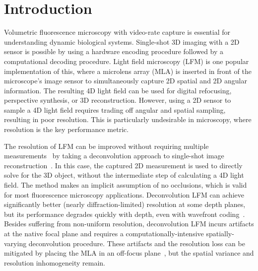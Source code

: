 \documentclass{osa-article}
\begin{document}
\section{Introduction}




Volumetric fluorescence microscopy with video-rate capture is essential for understanding dynamic biological systems. Single-shot 3D imaging with a 2D sensor is possible by using a hardware encoding procedure followed by a computational decoding procedure. Light field microscopy (LFM) \cite{lippmann1908LF,okano1997LF,Javidi2004lfm,javidi2006lfm,levoy2006lfm,martinez2018LFMreview} is one popular implementation of this, where a microlens array (MLA) is inserted in front of the microscope's image sensor to simultaneously capture 2D spatial and 2D angular information. The resulting 4D light field can be used for digital refocusing, perspective synthesis, or 3D reconstruction. However, using a 2D sensor to sample a 4D light field requires trading off angular and spatial sampling, resulting in poor resolution. This is particularly undesirable in microscopy, where resolution is the key performance metric.

The resolution of LFM can be improved without requiring multiple measurements~\cite{javidi2003LFsequence} by taking a deconvolution approach to single-shot image
reconstruction~\cite{broxton2013lfm,prevedel2014lfm_worm}. In this case, the captured 2D measurement is used to directly solve for the 3D object, without the intermediate step of calculating a 4D light field. The method makes an implicit assumption of no occlusions, which is valid for most fluorescence microscopy applications. Deconvolution LFM can achieve significantly better (nearly diffraction-limited) resolution at some depth planes, but its performance degrades quickly with depth, even with wavefront coding~\cite{cohen2014enhancing}. Besides suffering from non-uniform resolution, deconvolution LFM incurs artifacts at the native focal plane and requires a computationally-intensive spatially-varying deconvolution procedure. These artifacts and the resolution loss can be mitigated by placing the MLA in an off-focus plane~\cite{lumsdaine2009plenoptic2,li2019plenoptic2LFM,chen2020plenoptic2miniscope}, but the spatial variance and resolution inhomogeneity remain.
\end{document}
